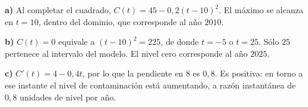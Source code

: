 \textbf{a)} Al completar el cuadrado, $C(t)=45-0{,}2(t-10)^2$. El máximo se alcanza en $t=10$, dentro del dominio, que corresponde al año $\boxed{2010}$.

\textbf{b)} $C(t)=0$ equivale a $(t-10)^2=225$, de donde $t=-5$ o $t=25$. Sólo $25$ pertenece al intervalo del modelo. El nivel cero corresponde al año $\boxed{2025}$.

\textbf{c)} $C'(t)=4-0{,}4t$, por lo que la pendiente en $8$ es $\boxed{0{,}8}$. Es positiva: en torno a ese instante el nivel de contaminación está aumentando, a razón instantánea de $0{,}8$ unidades de nivel por año.
